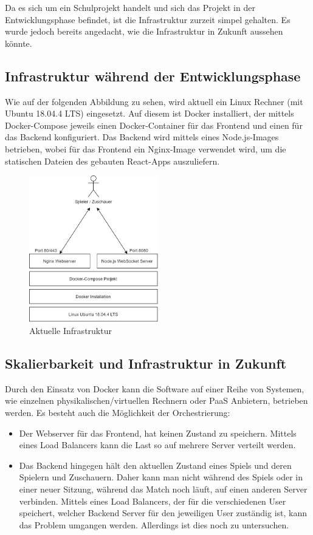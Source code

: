 \documentclass[11pt,a4paper,german]{scrartcl}
\begin{document}
Da es sich um ein Schulprojekt handelt und sich das Projekt in der Entwicklungsphase befindet, ist die Infrastruktur zurzeit simpel gehalten. Es wurde jedoch bereits angedacht, wie die Infrastruktur in Zukunft aussehen könnte.

\subsection{Infrastruktur während der Entwicklungsphase}
Wie auf der folgenden Abbildung zu sehen, wird aktuell ein Linux Rechner (mit Ubuntu 18.04.4 LTS) eingesetzt. Auf diesem ist Docker installiert, der mittels Docker-Compose jeweils einen Docker-Container für das Frontend und einen für das Backend konfiguriert. Das Backend wird mittels eines Node.js-Images betrieben, wobei für das Frontend ein Nginx-Image verwendet wird, um die statischen Dateien des gebauten React-Apps auszuliefern.

\begin{figure}[h]
  \centering
  \includegraphics[width=0.5\textwidth]{infrastructure_current.png}
  \caption{Aktuelle Infrastruktur}
\end{figure}

\subsection{Skalierbarkeit und Infrastruktur in Zukunft}
Durch den Einsatz von Docker kann die Software auf einer Reihe von Systemen, wie einzelnen physikalischen/virtuellen Rechnern oder PaaS Anbietern, betrieben werden. Es besteht auch die Möglichkeit der Orchestrierung: 
\begin{itemize}
  \item Der Webserver für das Frontend, hat keinen Zustand zu speichern. Mittels eines Load Balancers kann die Last so auf mehrere Server verteilt werden.
  \item Das Backend hingegen hält den aktuellen Zustand eines Spiels und deren Spielern und Zuschauern. Daher kann man nicht während des Spiels oder in einer neuer Sitzung, während das Match noch läuft, auf einen anderen Server verbinden. Mittels eines Load Balancers, der für die verschiedenen User speichert, welcher Backend Server für den jeweiligen User zuständig ist, kann das Problem umgangen werden. Allerdings ist dies noch zu untersuchen.
\end{itemize}
\end{document}
